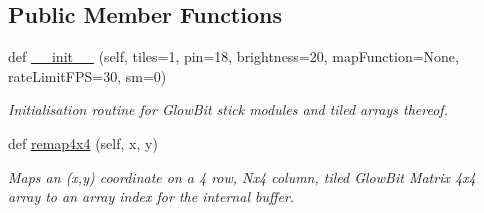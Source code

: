 \subsection*{Public Member Functions}
\begin{DoxyCompactItemize}
\item 
def \hyperlink{classglowbit_1_1matrix4x4_a9a9f870a9505b2a4e27519a8e279e81c}{\+\_\+\+\_\+init\+\_\+\+\_\+} (self, tiles=1, pin=18, brightness=20, map\+Function=None, rate\+Limit\+F\+PS=30, sm=0)
\begin{DoxyCompactList}\small\item\em Initialisation routine for Glow\+Bit stick modules and tiled arrays thereof. \end{DoxyCompactList}\item 
def \hyperlink{classglowbit_1_1matrix4x4_aea814e3be265990137d4027ae181e58d}{remap4x4} (self, x, y)
\begin{DoxyCompactList}\small\item\em Maps an (x,y) coordinate on a 4 row, Nx4 column, tiled Glow\+Bit Matrix 4x4 array to an array index for the internal buffer. \end{DoxyCompactList}\end{DoxyCompactItemize}
